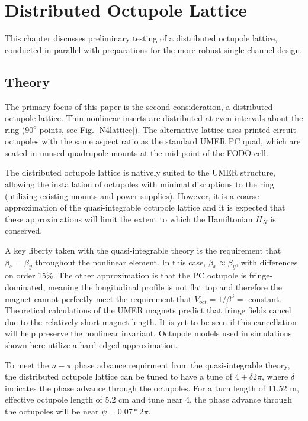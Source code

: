 
\renewcommand{\thechapter}{8}

\chapter{Distributed Octupole Lattice}




This chapter discusses preliminary testing of a distributed octupole lattice, conducted in parallel with preparations for the more robust single-channel design.

\section{Theory}

The primary focus of this paper is the second consideration, a distributed octupole lattice. Thin nonlinear inserts are distributed at even intervals about the ring ($90^o$ points, see Fig. \ref{N4lattice}).  The alternative lattice uses printed circuit octupoles with the same aspect ratio as the standard UMER PC quad, which are seated in unused quadrupole mounts at the mid-point of the FODO cell. 

The distributed octupole lattice is natively suited to the UMER structure, allowing the installation of octupoles with minimal disruptions to the ring (utilizing existing mounts and power supplies). However, it is a coarse approximation of the quasi-integrable octupole lattice and it is expected that these approximations will limit the extent to which the Hamiltonian $H_N$ is conserved.

A key liberty taken with the quasi-integrable theory is the requirement that $\beta_x=\beta_y$ throughout the nonlinear element. In this case, $\beta_x \approx \beta_y$, with differences on order 15\%. The other approximation is that the PC octupole is fringe-dominated, meaning the longitudinal profile is not flat top and therefore the magnet cannot perfectly meet the requirement that $V_{oct} = 1/\beta^3 =$ constant. Theoretical calculations of the UMER magnets predict that fringe fields cancel due to the relatively short magnet length.\cite{VenturiniThesis} It is yet to be seen if this cancellation will help preserve the nonlinear invariant. Octupole models used in simulations shown here utilize a hard-edged approximation. 

To meet the $n-\pi$ phase advance requirment from the quasi-integrable theory, the distributed octupole lattice can be tuned to have a tune of $4+\delta 2\pi$, where $\delta$ indicates the phase advance through the octupoles. For a turn length of 11.52 m, effective octupole length of 5.2 cm and tune near 4, the phase advance through the octupoles will be near $\psi = 0.07 *2\pi$. 





